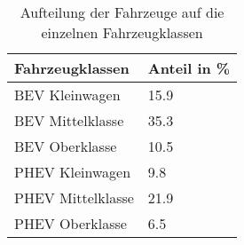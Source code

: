 {
\renewcommand{\arraystretch}{1.2}%
\begin{table}[H]
	\begin{center}
		\caption{Aufteilung der Fahrzeuge auf die einzelnen Fahrzeugklassen}
		\begin{tabu} to 0.6\textwidth {X[1] X[1, r]}
			\hline
			Fahrzeugklassen   & Anteil in \si{\percent}  \\ \hline
			BEV Kleinwagen    & \num{15.9}               \\
			BEV Mittelklasse  & \num{35.3}               \\
			BEV Oberklasse    & \num{10.5}               \\
			PHEV Kleinwagen   & \num{9.8}                \\
			PHEV Mittelklasse & \num{21.9}               \\
			PHEV Oberklasse   & \num{6.5}                \\ \hline
		\end{tabu}
		\label{tab:CarSplit}
	\end{center}
	\vspace{-3mm}%
\end{table}
}